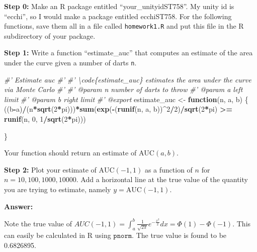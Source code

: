 \documentclass[
]{article}
\newenvironment{Shaded}{\begin{snugshade}}{\end{snugshade}}
\newcommand{\CommentTok}[1]{\textcolor[rgb]{0.56,0.35,0.01}{\textit{#1}}}
\newcommand{\ControlFlowTok}[1]{\textcolor[rgb]{0.13,0.29,0.53}{\textbf{#1}}}
\newcommand{\DecValTok}[1]{\textcolor[rgb]{0.00,0.00,0.81}{#1}}
\newcommand{\KeywordTok}[1]{\textcolor[rgb]{0.13,0.29,0.53}{\textbf{#1}}}
\newcommand{\NormalTok}[1]{#1}
\newcommand{\OperatorTok}[1]{\textcolor[rgb]{0.81,0.36,0.00}{\textbf{#1}}}
\newcommand{\StringTok}[1]{\textcolor[rgb]{0.31,0.60,0.02}{#1}}
\begin{document}
\textbf{Step 0:} Make an R package entitled ``your\_unityidST758''. My
unity id is ``ecchi'', so I would make a package entitled ecchiST758.
For the following functions, save them all in a file called
\texttt{homework1.R} and put this file in the R subdirectory of your
package.

\textbf{Step 1:} Write a function ``estimate\_auc'' that computes an
estimate of the area under the curve given a number of darts \texttt{n}.

\begin{Shaded}
\begin{Highlighting}[]
\CommentTok{#' Estimate auc}
\CommentTok{#' }
\CommentTok{#' \textbackslash{}code\{estimate_auc\} estimates the area under the curve via Monte Carlo}
\CommentTok{#' }
\CommentTok{#' @param n number of darts to throw}
\CommentTok{#' @param a left limit}
\CommentTok{#' @param b right limit}
\CommentTok{#' @export}
\NormalTok{estimate_auc <-}\StringTok{ }\ControlFlowTok{function}\NormalTok{(n, a, b) \{}
\NormalTok{((b}\OperatorTok{-}\NormalTok{a)}\OperatorTok{/}\NormalTok{(n}\OperatorTok{*}\KeywordTok{sqrt}\NormalTok{(}\DecValTok{2}\OperatorTok{*}\NormalTok{pi)))}\OperatorTok{*}\KeywordTok{sum}\NormalTok{(}\KeywordTok{exp}\NormalTok{(}\OperatorTok{-}\NormalTok{(}\KeywordTok{runif}\NormalTok{(n, a, b))}\OperatorTok{^}\DecValTok{2}\OperatorTok{/}\DecValTok{2}\NormalTok{)}\OperatorTok{/}\KeywordTok{sqrt}\NormalTok{(}\DecValTok{2}\OperatorTok{*}\NormalTok{pi) }
                           \OperatorTok{>=}\StringTok{ }\KeywordTok{runif}\NormalTok{(n, }\DecValTok{0}\NormalTok{, }\DecValTok{1}\OperatorTok{/}\KeywordTok{sqrt}\NormalTok{(}\DecValTok{2}\OperatorTok{*}\NormalTok{pi)))}
  
\NormalTok{\}}
\end{Highlighting}
\end{Shaded}

Your function should return an estimate of \(\text{AUC}(a,b)\).

\textbf{Step 2:} Plot your estimate of \(\text{AUC}(-1,1)\) as a
function of \(n\) for \(n = 10, 100, 1000, 10000\). Add a horizontal
line at the true value of the quantity you are trying to estimate,
namely \(y = \text{AUC}(-1,1)\).

\textbf{Answer:}

Note the true value of
\(AUC(-1,1)= \int_a^b \frac{1}{\sqrt{2\pi}}e^{-\frac{x^2}{2}}dx = \Phi(1) - \Phi(-1)\).
This can easily be calculated in R using \(\texttt{pnorm}\). The true
value is found to be 0.6826895.
\end{document}
